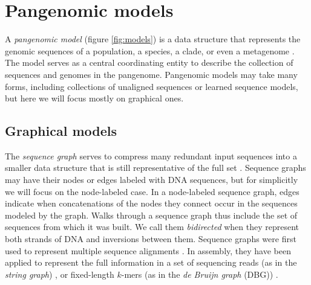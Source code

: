 \section{Pangenomic models}
\label{sec:models}

A \emph{pangenomic model} (figure \ref{fig:models}) is a data structure that represents the genomic sequences of a population, a species, a clade, or even a metagenome \cite{computational2016computational}.
The model serves as a central coordinating entity to describe the collection of sequences and genomes in the pangenome.
Pangenomic models may take many forms, including collections of unaligned sequences or learned sequence models, but here we will focus mostly on graphical ones.

\subsection{Graphical models}

The \emph{sequence graph} serves to compress many redundant input sequences into a smaller data structure that is still representative of the full set \cite{hein1989new}.
Sequence graphs may have their nodes or edges labeled with DNA sequences, but for simplicitly we will focus on the node-labeled case.
In a node-labeled sequence graph, edges indicate when concatenations of the nodes they connect occur in the sequences modeled by the graph.
Walks through a sequence graph thus include the set of sequences from which it was built.
We call them \emph{bidirected} when they represent both strands of DNA and inversions between them.
Sequence graphs were first used to represent multiple sequence alignments \cite{hein1989new,Lee_2002}.
In assembly, they have been applied to represent the full information in a set of sequencing reads (as in the \emph{string graph}) \cite{Myers_2005}, or fixed-length $k$-mers (as in the \emph{de Bruijn graph} (DBG)) \cite{Pevzner_2001}.

